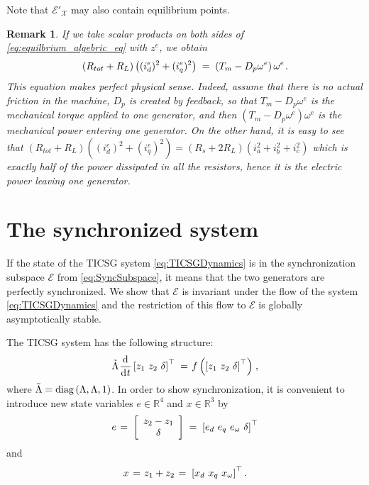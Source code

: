 \documentclass[letterpaper,10pt,conference]{ieeeconf}
\newtheorem{remark}[theorem]{Remark}
\newcommand{\rline}  {{\mathbb R}}
\renewcommand{\L}    {{\Lambda}}
\renewcommand{\o}    {{\omega}}
\newcommand{\m}      {{\hbox{\hskip 1pt}}}
\newcommand{\dd}     {{\rm d\hbox{\hskip 0.5pt}}}
\newcommand{\Emscr}  {{\mathcal{E}}}
\newcommand{\Xmscr}  {{\mathcal{X}}}
\begin{document}
Note that $\Emscr'_\Xmscr$ may also contain equilibrium points.

\begin{remark}
If we take scalar products on both sides of 
\eqref{eq:equilbrium_algebric_eq} with $z^e$, we obtain
$$ \left(R_{tot}+R_L\right)\left((i_d^e)^2+(i_q^e)^2\right) \m=\m
   \left(T_m-D_p\o^e\right)\o^e \m.$$
This equation makes perfect physical sense. Indeed, assume that there
is no actual friction in the machine, $D_{p}$ is created by feedback,
so that $T_{m}-D_{p}\omega^{e}$ is the mechanical torque applied to
one generator, and then $\left(T_{m}-D_{p}\omega^{e}\right)\omega^{e}$
is the mechanical power entering one generator. On the other hand, it
is easy to see that $\left(R_{tot}+R_L\right)\left((i_d^e)^2+
(i_q^e)^2\right)=\left(R_s+2R_L\right)\left(i_a^2+i_b^2+i_c^2\right)$
which is exactly half of the power dissipated in all the resistors,
hence it is the electric power leaving one generator.
\end{remark}

\section{The synchronized system} \label{sec5} %

If the state of the TICSG system \eqref{eq:TICSGDynamics} is in the
synchronization subspace $\Emscr$ from \eqref{eq:SyncSubspace}, it
means that the two generators are perfectly synchronized. We show that
$\Emscr$ is invariant under the flow of the system
\eqref{eq:TICSGDynamics} and the restriction of this flow to $\Emscr$
is globally asymptotically stable.

The TICSG system has the following structure: \vspace{-1mm}
$$ \tilde{\L}\m\frac{\dd}{\dd t}\left[z_1\ z_2\ \delta\right]^{\top}
   \m=\m f\left( \left[z_1\ z_2\ \delta\right]^{\top} \right) \m,$$
where $\tilde{\L}={\rm diag}\left(\L,\L,1\right)$. In order to show 
synchronization, it is convenient to introduce new 
state variables $e\in\rline^4$ and $x\in\rline^3$ by \vspace{-2mm}
$$ e \m=\m \left[ \begin{array}{c} z_2 - z_1\\ \delta \end{array} 
   \right] \m=\m \left[e_d\ e_q\ e_\o\ \delta \right]^\top$$
and \vspace{-2mm}
$$x \m=\m z_1+z_2 \m=\m \left[ x_d\ x_q\ x_\o\right]^\top .$$  
\end{document}
